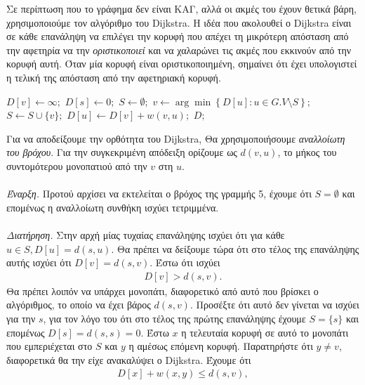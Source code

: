 \documentclass{article}
\makeatletter
\newcommand{\sectiontitle}[1]{%
  \vspace{1.5em}%
  \noindent{\Large\bfseries\emph{#1}}\par%
  \vspace{0.5em}%
}
\newenvironment{yellowalgo}{
    \begin{tcolorbox}[colback=myyellow, colframe=myyellow, boxrule=0.5pt]
    \begin{algorithmic}[1]
    \setcounter{ALG@line}{-1}
}{
    \end{algorithmic}
    \end{tcolorbox}
}
\makeatother
\begin{document}
\sectiontitle{Ο αλγόριθμος του Dijkstra}
\noindent
Σε περίπτωση που το γράφημα δεν είναι ΚΑΓ, αλλά οι ακμές του έχουν θετικά βάρη, χρησιμοποιούμε τον αλγόριθμο του Dijkstra. Η ιδέα που ακολουθεί ο Dijkstra είναι σε κάθε επανάληψη να επιλέγει την κορυφή 
που απέχει τη μικρότερη απόσταση από την αφετηρία να την \emph{οριστικοποιεί} και να χαλαρώνει τις ακμές που εκκινούν από την κορυφή αυτή. Όταν μία κορυφή είναι οριστικοποιημένη, σημαίνει ότι έχει υπολογιστεί η τελική
της απόσταση από την αφετηριακή κορυφή.  
\begin{yellowalgo}
        \State $D[v] \gets \infty;$
    \EndFor
    \State $D[s] \gets 0;$
    \State $S \gets \emptyset;$
        \State $v \gets {\arg\min}\left\{D[u] : u \in G.V \setminus S\right\};$
        \State $S \gets S \cup \{v\};$
                \State $D[u] \gets D[v] + w(v, u);$
            \EndIf
        \EndFor
    \EndWhile
    \State \Return $D;$
\EndFunction
\end{yellowalgo}
\noindent 
Για να αποδείξουμε την ορθότητα του Dijkstra, Θα χρησιμοποιήσουμε \emph{αναλλοίωτη του βρόχου}. Για την συγκεκριμένη απόδειξη ορίζουμε ως $d(v, u)$, το μήκος του συντομότερου μονοπατιού
 από την $v$ στη $u$. 
\\ \\
\emph{Έναρξη.} Προτού αρχίσει να εκτελείται ο βρόχος της γραμμής 5, έχουμε ότι $S = \emptyset$ και επομένως η αναλλοίωτη συνθήκη ισχύει τετριμμένα. 
\\ \\
\emph{Διατήρηση.} Στην αρχή μίας τυχαίας επανάληψης ισχύει ότι για κάθε $u \in S, D[u] = d(s, u)$. Θα πρέπει να δείξουμε τώρα ότι στο τέλος της επανάληψης αυτής ισχύει ότι $D[v] = d(s, v)$. Έστω ότι ισχύει
\begin{align*}
    D[v] > d(s, v).
\end{align*} 
Θα πρέπει λοιπόν να υπάρχει μονοπάτι, διαφορετικό από αυτό που βρίσκει ο αλγόριθμος, το οποίο να έχει βάρος $d(s, v)$. Προσέξτε ότι αυτό δεν γίνεται να ισχύει για την $s$, για τον λόγο
του ότι στο τέλος της πρώτης επανάληψης έχουμε $S = \{s\}$ και επομένως $D[s] = d(s, s) = 0$. Έστω $x$ η τελευταία κορυφή σε αυτό το μονοπάτι που εμπεριέχεται στο $S$ και $y$ η αμέσως επόμενη κορυφή.
Παρατηρήστε ότι $y \neq v$, διαφορετικά θα την είχε ανακαλύψει ο Dijkstra. Έχουμε ότι
\begin{align*}
    D[x] + w(x, y) \leq d(s, v), 
\end{align*}
\end{document}
